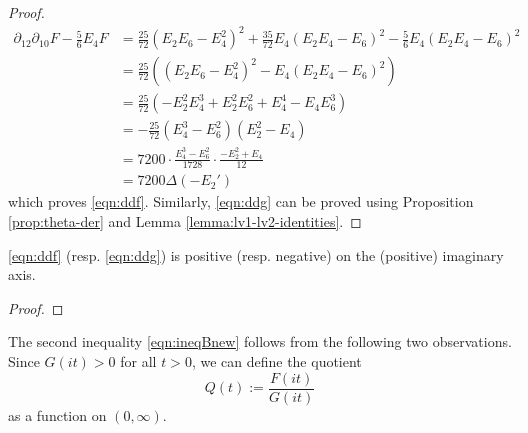 \begin{proof}
\begin{align}
  \partial_{12}\partial_{10}F - \frac{5}{6} E_4 F &= \frac{25}{72}(E_2 E_6 - E_4^2)^2 + \frac{35}{72} E_4 (E_2 E_4 - E_6)^2 - \frac{5}{6} E_4 (E_2 E_4 - E_6)^2 \\
  &= \frac{25}{72} ((E_2 E_6 - E_4^2)^2 - E_4 (E_2 E_4 - E_6)^2) \\
  &= \frac{25}{72} (- E_2^2 E_4^3 + E_2^2 E_6^2 + E_4^4 - E_4 E_6^3) \\
  &= -\frac{25}{72} (E_4^3 - E_6^2) (E_2^2 - E_4) \\
  &= 7200 \cdot \frac{E_4^3 - E_6^2}{1728} \cdot \frac{-E_2^2 + E_4}{12}\\
  &= 7200 \Delta (-E_2')
\end{align}
which proves \eqref{eqn:ddf}.
Similarly, \eqref{eqn:ddg} can be proved using Proposition \ref{prop:theta-der} and Lemma \ref{lemma:lv1-lv2-identities}.
\end{proof}

\begin{corollary}\label{cor:F-G-de}
\eqref{eqn:ddf} (resp. \eqref{eqn:ddg}) is positive (resp. negative) on the (positive) imaginary axis.
\end{corollary}
\begin{proof}
\end{proof}


The second inequality \eqref{eqn:ineqBnew} follows from the following two observations.
Since $G(it) > 0$ for all $t > 0$, we can define the quotient
\begin{equation}\label{eqn:Q}
  Q(t) := \frac{F(it)}{G(it)}
\end{equation}
as a function on $(0, \infty)$.

